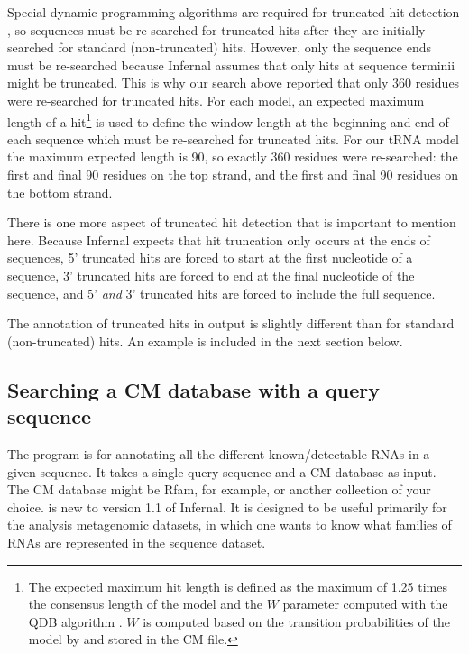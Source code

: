 Special dynamic programming algorithms are required for truncated hit
detection \citep{KolbeEddy09}, so sequences must be re-searched for
truncated hits after they are initially searched for standard
(non-truncated) hits. However, only the sequence ends must be
re-searched because Infernal assumes that only hits at sequence
terminii might be truncated. This is why our search above reported
that only 360 residues were re-searched for truncated hits. For each
model, an expected maximum length of a hit\footnote{The expected
  maximum hit length is defined as the maximum of 1.25 times the
  consensus length of the model and the $W$ parameter computed with
  the QDB algorithm \citep{NawrockiEddy07}. $W$ is computed based on
  the transition probabilities of the model by  and
  stored in the CM file.} 
is used to define the window length at the
beginning and end of each sequence which must be re-searched for
truncated hits. For our tRNA model the maximum expected length is
90, so exactly 360 residues were re-searched: the first and final 90
residues on the top strand, and the first and final 90 residues on
the bottom strand.

There is one more aspect of truncated hit detection that is important
to mention here. Because Infernal expects that hit truncation only
occurs at the ends of sequences, 5' truncated hits are forced to start
at the first nucleotide of a sequence, 3' truncated hits are forced to
end at the final nucleotide of the sequence, and 5' \emph{and} 3'
truncated hits are forced to include the full sequence.

The annotation of truncated hits in  output is slightly
different than for standard (non-truncated) hits. An example is
included in the next section below.

\subsection{Searching a CM database with a query sequence}

The  program is for annotating all the different
known/detectable RNAs in a given sequence. It takes a single query
sequence and a CM database as input. The CM database might be Rfam,
for example, or another collection of your choice.  is
new to version 1.1 of Infernal. It is designed to be useful primarily
for the analysis metagenomic datasets, in which one wants to know what
families of RNAs are represented in the sequence dataset.


